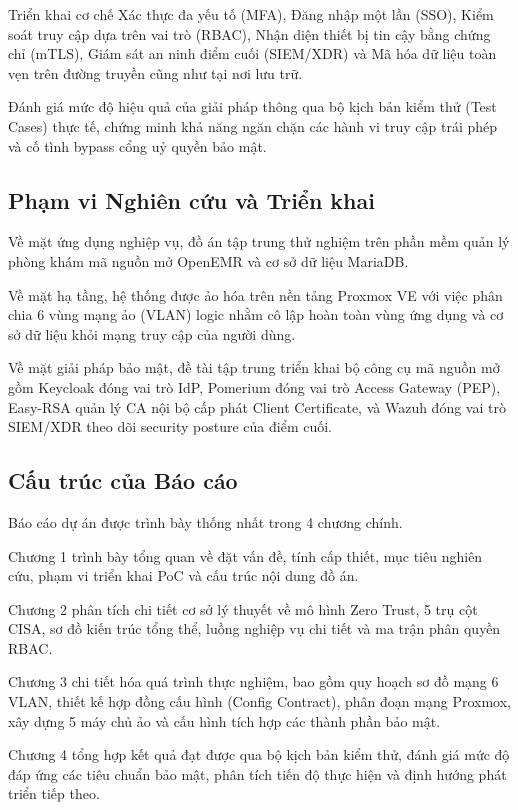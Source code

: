 Triển khai cơ chế Xác thực đa yếu tố (MFA), Đăng nhập một lần (SSO), Kiểm soát truy cập dựa trên vai trò (RBAC), Nhận diện thiết bị tin cậy bằng chứng chỉ (mTLS), Giám sát an ninh điểm cuối (SIEM/XDR) và Mã hóa dữ liệu toàn vẹn trên đường truyền cũng như tại nơi lưu trữ.

Đánh giá mức độ hiệu quả của giải pháp thông qua bộ kịch bản kiểm thử (Test Cases) thực tế, chứng minh khả năng ngăn chặn các hành vi truy cập trái phép và cố tình bypass cổng uỷ quyền bảo mật.

\subsection{Phạm vi Nghiên cứu và Triển khai}

Về mặt ứng dụng nghiệp vụ, đồ án tập trung thử nghiệm trên phần mềm quản lý phòng khám mã nguồn mở OpenEMR và cơ sở dữ liệu MariaDB.

Về mặt hạ tầng, hệ thống được ảo hóa trên nền tảng Proxmox VE với việc phân chia 6 vùng mạng ảo (VLAN) logic nhằm cô lập hoàn toàn vùng ứng dụng và cơ sở dữ liệu khỏi mạng truy cập của người dùng.

Về mặt giải pháp bảo mật, đề tài tập trung triển khai bộ công cụ mã nguồn mở gồm Keycloak đóng vai trò IdP, Pomerium đóng vai trò Access Gateway (PEP), Easy-RSA quản lý CA nội bộ cấp phát Client Certificate, và Wazuh đóng vai trò SIEM/XDR theo dõi security posture của điểm cuối.

\subsection{Cấu trúc của Báo cáo}

Báo cáo dự án được trình bày thống nhất trong 4 chương chính.

Chương 1 trình bày tổng quan về đặt vấn đề, tính cấp thiết, mục tiêu nghiên cứu, phạm vi triển khai PoC và cấu trúc nội dung đồ án.

Chương 2 phân tích chi tiết cơ sở lý thuyết về mô hình Zero Trust, 5 trụ cột CISA, sơ đồ kiến trúc tổng thể, luồng nghiệp vụ chi tiết và ma trận phân quyền RBAC.

Chương 3 chi tiết hóa quá trình thực nghiệm, bao gồm quy hoạch sơ đồ mạng 6 VLAN, thiết kế hợp đồng cấu hình (Config Contract), phân đoạn mạng Proxmox, xây dựng 5 máy chủ ảo và cấu hình tích hợp các thành phần bảo mật.

Chương 4 tổng hợp kết quả đạt được qua bộ kịch bản kiểm thử, đánh giá mức độ đáp ứng các tiêu chuẩn bảo mật, phân tích tiến độ thực hiện và định hướng phát triển tiếp theo.
